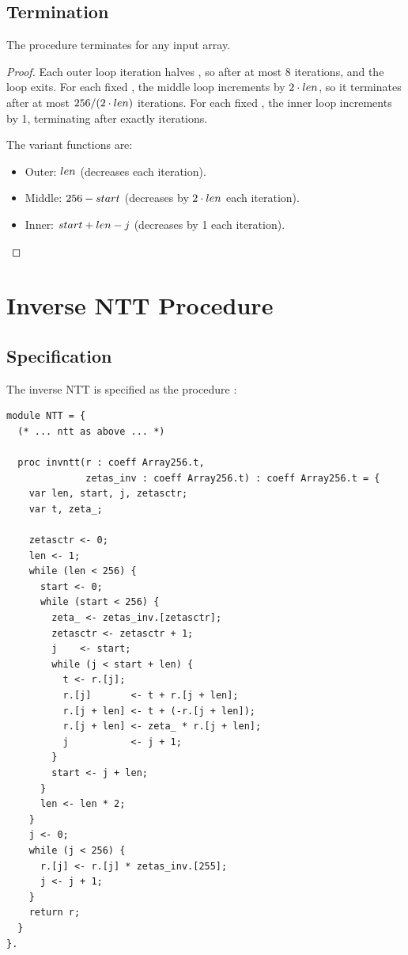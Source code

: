 \subsection{Termination}

\begin{lemma}
  The procedure  terminates for any input array.
\label{lem:ntt_term}
\end{lemma}

\begin{proof}
  Each outer loop iteration halves , so after at most 8 iterations,
   and the loop exits.  For each fixed , the middle loop
  increments  by $2 \cdot len$, so it terminates after at most
  $256 / (2\cdot len)$ iterations.  For each fixed , the inner loop
  increments  by 1, terminating after exactly  iterations.

  The variant functions are:
  \begin{itemize}
    \item Outer: $len$ (decreases each iteration).
    \item Middle: $256 - start$ (decreases by $2\cdot len$ each iteration).
    \item Inner: $start + len - j$ (decreases by 1 each iteration).
  \end{itemize}
\end{proof}

\section{Inverse NTT Procedure}

\subsection{Specification}

The inverse NTT is specified as the \easycrypt{} procedure :

\begin{lstlisting}[language=EasyCrypt,
  caption={Inverse NTT specification in \texttt{NTT\_Fq.ec}},
  label={lst:invntt_spec}]
module NTT = {
  (* ... ntt as above ... *)

  proc invntt(r : coeff Array256.t,
              zetas_inv : coeff Array256.t) : coeff Array256.t = {
    var len, start, j, zetasctr;
    var t, zeta_;

    zetasctr <- 0;
    len <- 1;
    while (len < 256) {
      start <- 0;
      while (start < 256) {
        zeta_ <- zetas_inv.[zetasctr];
        zetasctr <- zetasctr + 1;
        j    <- start;
        while (j < start + len) {
          t <- r.[j];
          r.[j]       <- t + r.[j + len];
          r.[j + len] <- t + (-r.[j + len]);
          r.[j + len] <- zeta_ * r.[j + len];
          j           <- j + 1;
        }
        start <- j + len;
      }
      len <- len * 2;
    }
    j <- 0;
    while (j < 256) {
      r.[j] <- r.[j] * zetas_inv.[255];
      j <- j + 1;
    }
    return r;
  }
}.
\end{lstlisting}

